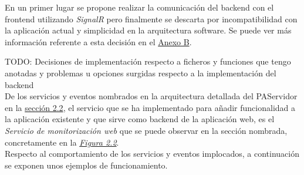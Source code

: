 En un primer lugar se propone realizar la comunicación del backend con el frontend utilizando \textit{SignalR} \cite{signalr} pero finalmente se descarta por incompatibilidad con la aplicación actual y simplicidad en la arquitectura software. Se puede ver más información referente a esta decisión en el \hyperref[anexo-b]{Anexo B}. \newline


TODO: Decisiones de implementación respecto a ficheros y funciones que tengo anotadas y problemas u opciones surgidas respecto a la implementación del backend\\



De los servicios y eventos nombrados en la arquitectura detallada del PAServidor en la \hyperref[section-arquitectura]{sección 2.2}, el servicio que se ha implementado para añadir funcionalidad a la aplicación existente y que sirve como backend de la aplicación web, es el \textit{Servicio de monitorización web} que se puede observar en la sección nombrada, concretamente en la \hyperref[fig:PAServidor]{\textit{Figura 2.2}}.\\

Respecto al comportamiento de los servicios y eventos implocados, a continuación se exponen unos ejemplos de funcionamiento.\\

